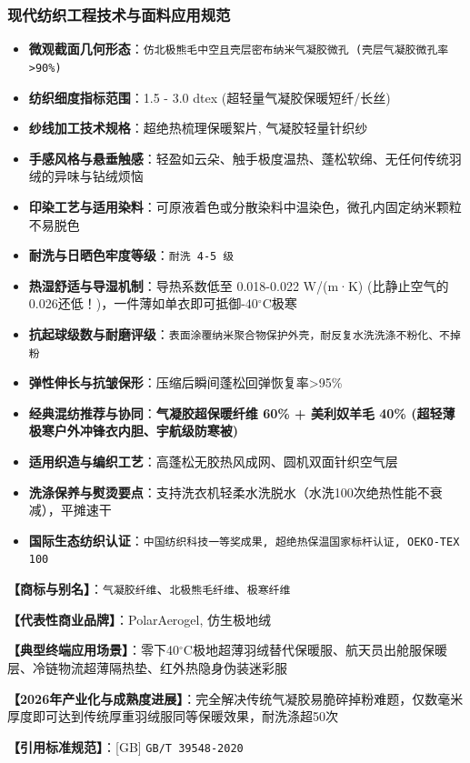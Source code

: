 \documentclass[11pt,openright,twoside,UTF8]{ctexbook}
\begin{document}
\subsubsection*{现代纺织工程技术与面料应用规范}
\begin{itemize} \setlength{\itemsep}{2pt}
    \item \textbf{微观截面几何形态}：\texttt{仿北极熊毛中空且壳层密布纳米气凝胶微孔 (壳层气凝胶微孔率\textgreater{}90\%)}
    \item \textbf{纺织细度指标范围}：1.5 - 3.0 dtex (超轻量气凝胶保暖短纤/长丝)
    \item \textbf{纱线加工技术规格}：超绝热梳理保暖絮片, 气凝胶轻量针织纱
    \item \textbf{手感风格与悬垂触感}：轻盈如云朵、触手极度温热、蓬松软绵、无任何传统羽绒的异味与钻绒烦恼
    \item \textbf{印染工艺与适用染料}：可原液着色或分散染料中温染色，微孔内固定纳米颗粒不易脱色
    \item \textbf{耐洗与日晒色牢度等级}：\texttt{耐洗 4-5 级}
    \item \textbf{热湿舒适与导湿机制}：导热系数低至 0.018-0.022 W/(m·K) (比静止空气的0.026还低！)，一件薄如单衣即可抵御-40$^\circ\mathrm{C}$极寒
    \item \textbf{抗起球级数与耐磨评级}：\texttt{表面涂覆纳米聚合物保护外壳，耐反复水洗洗涤不粉化、不掉粉}
    \item \textbf{弹性伸长与抗皱保形}：压缩后瞬间蓬松回弹恢复率\textgreater{}95\%
    \item \textbf{经典混纺推荐与协同}：\textbf{气凝胶超保暖纤维 60\% + 美利奴羊毛 40\% (超轻薄极寒户外冲锋衣内胆、宇航级防寒被)}
    \item \textbf{适用织造与编织工艺}：高蓬松无胶热风成网、圆机双面针织空气层
    \item \textbf{洗涤保养与熨烫要点}：支持洗衣机轻柔水洗脱水（水洗100次绝热性能不衰减），平摊速干
    \item \textbf{国际生态纺织认证}：\texttt{中国纺织科技一等奖成果, 超绝热保温国家标杆认证, OEKO-TEX 100}
\end{itemize}
\vspace{0.2cm}

\noindent\textbf{【商标与别名】}：\texttt{气凝胶纤维}、\texttt{北极熊毛纤维}、\texttt{极寒纤维}\par
\noindent\textbf{【代表性商业品牌】}：PolarAerogel, 仿生极地绒\par
\noindent\textbf{【典型终端应用场景】}：零下40$^\circ\mathrm{C}$极地超薄羽绒替代保暖服、航天员出舱服保暖层、冷链物流超薄隔热垫、红外热隐身伪装迷彩服\par
\noindent\textbf{【2026年产业化与成熟度进展】}：完全解决传统气凝胶易脆碎掉粉难题，仅数毫米厚度即可达到传统厚重羽绒服同等保暖效果，耐洗涤超50次\par
\noindent\textbf{【引用标准规范】}：[GB] \texttt{GB/T 39548-2020}\par
\vspace{0.5cm}
\end{document}
